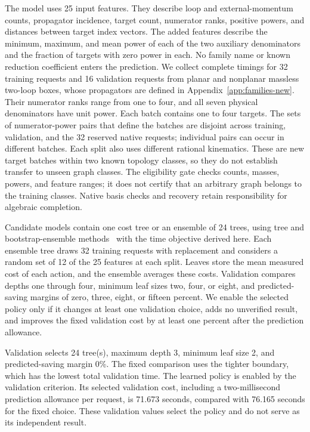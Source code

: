 The model uses 25 input features. They describe loop and external-momentum counts, propagator incidence, target count, numerator ranks, positive powers, and distances between target index vectors. The added features describe the minimum, maximum, and mean power of each of the two auxiliary denominators and the fraction of targets with zero power in each. No family name or known reduction coefficient enters the prediction. We collect complete timings for 32 training requests and 16 validation requests from planar and nonplanar massless two-loop boxes, whose propagators are defined in Appendix~\ref{app:families-new}. Their numerator ranks range from one to four, and all seven physical denominators have unit power. Each batch contains one to four targets. The sets of numerator-power pairs that define the batches are disjoint across training, validation, and the 32 reserved native requests; individual pairs can occur in different batches. Each split also uses different rational kinematics. These are new target batches within two known topology classes, so they do not establish transfer to unseen graph classes. The eligibility gate checks counts, masses, powers, and feature ranges; it does not certify that an arbitrary graph belongs to the training classes. Native basis checks and recovery retain responsibility for algebraic completion.

Candidate models contain one cost tree or an ensemble of 24 trees, using tree and bootstrap-ensemble methods~\cite{CART1984,Breiman2001Forest} with the time objective derived here. Each ensemble tree draws 32 training requests with replacement and considers a random set of 12 of the 25 features at each split. Leaves store the mean measured cost of each action, and the ensemble averages these costs. Validation compares depths one through four, minimum leaf sizes two, four, or eight, and predicted-saving margins of zero, three, eight, or fifteen percent. We enable the selected policy only if it changes at least one validation choice, adds no unverified result, and improves the fixed validation cost by at least one percent after the prediction allowance.

Validation selects 24 tree(s), maximum depth 3, minimum leaf size 2, and predicted-saving margin 0\%. The fixed comparison uses the tighter boundary, which has the lowest total validation time. The learned policy is enabled by the validation criterion. Its selected validation cost, including a two-millisecond prediction allowance per request, is 71.673 seconds, compared with 76.165 seconds for the fixed choice. These validation values select the policy and do not serve as its independent result.

